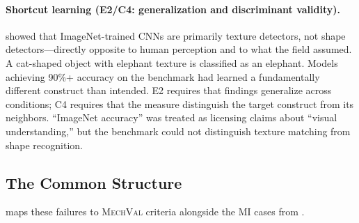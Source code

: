 \documentclass{article}
\newcommand{\mechval}{\textsc{MechVal}}
\begin{document}
\paragraph{Shortcut learning (E2/C4: generalization and discriminant validity).}
\citet{geirhos2019imagenet} showed that ImageNet-trained CNNs are primarily texture detectors, not shape detectors---directly opposite to human perception and to what the field assumed. A cat-shaped object with elephant texture is classified as an elephant. Models achieving 90\%+ accuracy on the benchmark had learned a fundamentally different construct than intended. E2 requires that findings generalize across conditions; C4 requires that the measure distinguish the target construct from its neighbors. ``ImageNet accuracy'' was treated as licensing claims about ``visual understanding,'' but the benchmark could not distinguish texture matching from shape recognition.

\subsection{The Common Structure}

 maps these failures to \mechval{} criteria alongside the MI cases from .
\end{document}
